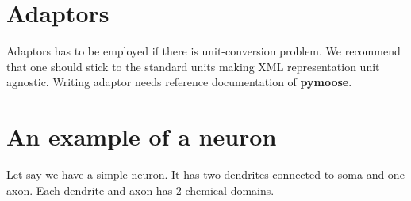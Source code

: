\section{Adaptors}

Adaptors has to be employed if there is unit-conversion problem. We recommend
that one should stick to the standard units making XML representation unit
agnostic. Writing adaptor needs reference documentation of \textbf{pymoose}.

\section{An example of a neuron}

Let say we have a simple neuron. It has two dendrites connected to soma and one
axon. Each dendrite and axon has 2 chemical domains. 




